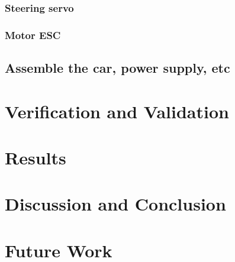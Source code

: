 \documentclass[11pt, titlepage]{article} %
\begin{document}
\subsubsection{Steering servo}
\subsubsection{Motor ESC}
\subsection{Assemble the car, power supply, etc}

\clearpage
\section{Verification and Validation}

\clearpage
\section{Results}

\clearpage
\section{Discussion and Conclusion}

\clearpage
\section{Future Work}
\clearpage
\clearpage
\clearpage
\appendix
\clearpage
\end{document}
